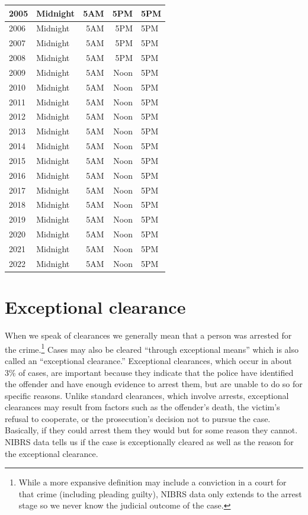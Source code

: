 \documentclass[
]{krantz}
\begin{document}
\begin{longtable}[t]{l|l|r|r|l}
\hline
2005 & Midnight & 5AM & 5PM & 5PM\\
\hline
2006 & Midnight & 5AM & 5PM & 5PM\\
\hline
2007 & Midnight & 5AM & 5PM & 5PM\\
\hline
2008 & Midnight & 5AM & 5PM & 5PM\\
\hline
2009 & Midnight & 5AM & Noon & 5PM\\
\hline
2010 & Midnight & 5AM & Noon & 5PM\\
\hline
2011 & Midnight & 5AM & Noon & 5PM\\
\hline
2012 & Midnight & 5AM & Noon & 5PM\\
\hline
2013 & Midnight & 5AM & Noon & 5PM\\
\hline
2014 & Midnight & 5AM & Noon & 5PM\\
\hline
2015 & Midnight & 5AM & Noon & 5PM\\
\hline
2016 & Midnight & 5AM & Noon & 5PM\\
\hline
2017 & Midnight & 5AM & Noon & 5PM\\
\hline
2018 & Midnight & 5AM & Noon & 5PM\\
\hline
2019 & Midnight & 5AM & Noon & 5PM\\
\hline
2020 & Midnight & 5AM & Noon & 5PM\\
\hline
2021 & Midnight & 5AM & Noon & 5PM\\
\hline
2022 & Midnight & 5AM & Noon & 5PM\\
\hline
\end{longtable}

\section{Exceptional clearance}\label{exceptional-clearance}

When we speak of clearances we generally mean that a person
was arrested for the crime.\footnote{While a more expansive
  definition may include a conviction in a court for that
  crime (including pleading guilty), NIBRS data only extends
  to the arrest stage so we never know the judicial outcome
  of the case.} Cases may also be cleared ``through
exceptional means'' which is also called an ``exceptional
clearance.'' Exceptional clearances, which occur in about
3\% of cases, are important because they indicate that the
police have identified the offender and have enough evidence
to arrest them, but are unable to do so for specific
reasons. Unlike standard clearances, which involve arrests,
exceptional clearances may result from factors such as the
offender's death, the victim's refusal to cooperate, or the
prosecution's decision not to pursue the case. Basically, if
they could arrest them they would but for some reason they
cannot. NIBRS data tells us if the case is exceptionally
cleared as well as the reason for the exceptional clearance.
\end{document}
